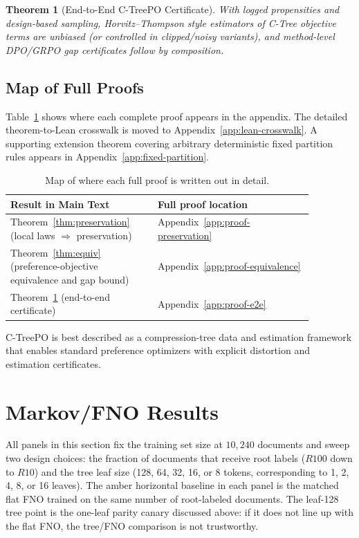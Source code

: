 \documentclass[11pt]{article}
\newtheorem{theorem}{Theorem}
\begin{document}
\begin{theorem}[End-to-End C-TreePO Certificate]\label{thm:e2e}
With logged propensities and design-based sampling,
Horvitz--Thompson style estimators of C-Tree objective terms are unbiased (or controlled in clipped/noisy variants),
and method-level DPO/GRPO gap certificates follow by composition.
\end{theorem}

\subsection{Map of Full Proofs}

Table~\ref{tab:proof-map-main} shows where each complete proof appears in the appendix.
The detailed theorem-to-Lean crosswalk is moved to Appendix~\ref{app:lean-crosswalk}.
A supporting extension theorem covering arbitrary deterministic fixed partition rules appears in Appendix~\ref{app:fixed-partition}.

\begin{table}[t]
\centering
\small
\begin{tabular}{p{0.42\linewidth}p{0.45\linewidth}}
\toprule
Result in Main Text & Full proof location \\
\midrule
Theorem~\ref{thm:preservation} (local laws $\Rightarrow$ preservation) & Appendix~\ref{app:proof-preservation} \\
Theorem~\ref{thm:equiv} (preference-objective equivalence and gap bound) & Appendix~\ref{app:proof-equivalence} \\
Theorem~\ref{thm:e2e} (end-to-end certificate) & Appendix~\ref{app:proof-e2e} \\
\bottomrule
\end{tabular}
\caption{Map of where each full proof is written out in detail.}
\label{tab:proof-map-main}
\end{table}

C-TreePO is best described as a compression-tree data and estimation framework that enables standard preference optimizers with explicit distortion and estimation certificates.

\section{Markov/FNO Results}\label{sec:empirics}

All panels in this section fix the training set size at $10{,}240$ documents and sweep two design choices: the fraction of documents that receive root labels ($R100$ down to $R10$) and the tree leaf size (128, 64, 32, 16, or 8 tokens, corresponding to 1, 2, 4, 8, or 16 leaves). The amber horizontal baseline in each panel is the matched flat FNO trained on the same number of root-labeled documents. The leaf-128 tree point is the one-leaf parity canary discussed above: if it does not line up with the flat FNO, the tree/FNO comparison is not trustworthy.
\end{document}
